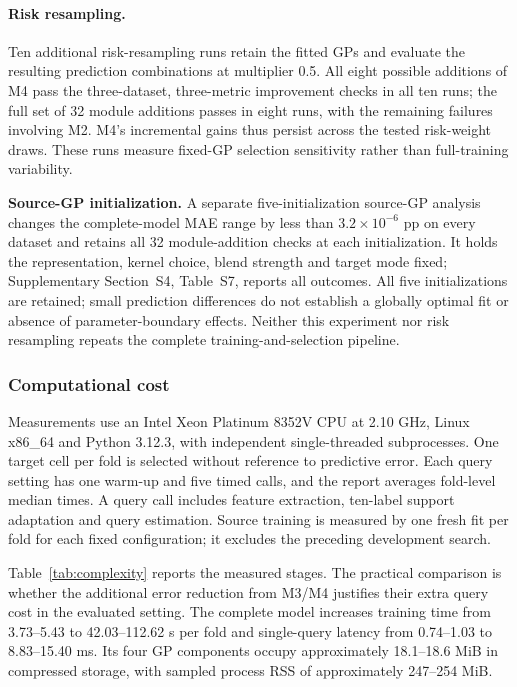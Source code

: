 \documentclass[preprint,12pt]{elsarticle}
\begin{document}
\paragraph{Risk resampling.}
Ten additional risk-resampling runs retain the fitted GPs and evaluate the resulting prediction combinations at multiplier 0.5. All eight possible additions of M4 pass the three-dataset, three-metric improvement checks in all ten runs; the full set of 32 module additions passes in eight runs, with the remaining failures involving M2. M4's incremental gains thus persist across the tested risk-weight draws. These runs measure fixed-GP selection sensitivity rather than full-training variability. \par\medskip\noindent\textbf{Source-GP initialization.} A separate five-initialization source-GP analysis changes the complete-model MAE range by less than $3.2\times10^{-6}$ pp on every dataset and retains all 32 module-addition checks at each initialization. It holds the representation, kernel choice, blend strength and target mode fixed; Supplementary Section~S4, Table~S7, reports all outcomes. All five initializations are retained; small prediction differences do not establish a globally optimal fit or absence of parameter-boundary effects. Neither this experiment nor risk resampling repeats the complete training-and-selection pipeline.

\subsubsection{Computational cost}
Measurements use an Intel Xeon Platinum 8352V CPU at 2.10 GHz, Linux x86\_64 and Python 3.12.3, with independent single-threaded subprocesses. One target cell per fold is selected without reference to predictive error. Each query setting has one warm-up and five timed calls, and the report averages fold-level median times. A query call includes feature extraction, ten-label support adaptation and query estimation. Source training is measured by one fresh fit per fold for each fixed configuration; it excludes the preceding development search.



Table~\ref{tab:complexity} reports the measured stages. The practical comparison is whether the additional error reduction from M3/M4 justifies their extra query cost in the evaluated setting. The complete model increases training time from 3.73--5.43 to 42.03--112.62 s per fold and single-query latency from 0.74--1.03 to 8.83--15.40 ms. Its four GP components occupy approximately 18.1--18.6 MiB in compressed storage, with sampled process RSS of approximately 247--254 MiB.
\end{document}
